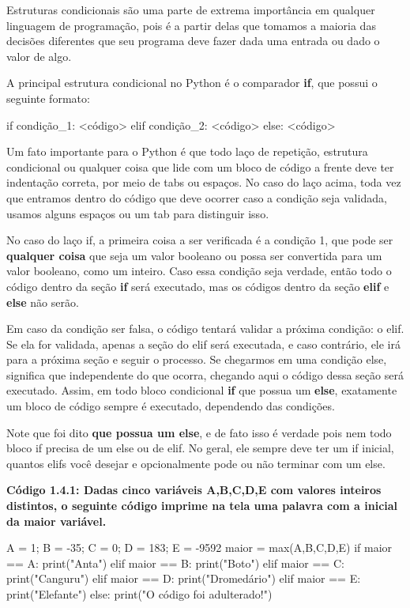 \documentclass[11pt, a4paper]{article}
\begin{document}
Estruturas condicionais são uma parte de extrema importância em qualquer linguagem de programação, pois é a partir delas que tomamos a maioria das decisões diferentes que seu programa deve fazer dada uma entrada ou dado o valor de algo.

A principal estrutura condicional no Python é o comparador \textbf{if}, que possui o seguinte formato:

\begin{code}
if condição_1:
    <código>
elif condição_2:
    <código>
else:
    <código>
\end{code}

Um fato importante para o Python é que todo laço de repetição, estrutura condicional ou qualquer coisa que lide com um bloco de código a frente deve ter indentação correta, por meio de tabs ou espaços. No caso do laço acima, toda vez que entramos dentro do código que deve ocorrer caso a condição seja validada, usamos alguns espaços ou um tab para distinguir isso.

No caso do laço if, a primeira coisa a ser verificada é a condição 1, que pode ser \textbf{qualquer coisa} que seja um valor booleano ou possa ser convertida para um valor booleano, como um inteiro. Caso essa condição seja verdade, então todo o código dentro da seção \textbf{if} será executado, mas os códigos dentro da seção \textbf{elif} e \textbf{else} não serão.

Em caso da condição ser falsa, o código tentará validar a próxima condição: o elif. Se ela for validada, apenas a seção do elif será executada, e caso contrário, ele irá para a próxima seção e seguir o processo. Se chegarmos em uma condição else, significa que independente do que ocorra, chegando aqui o código dessa seção será executado. Assim, em todo bloco condicional \textbf{if} que possua um \textbf{else}, exatamente um bloco de código sempre é executado, dependendo das condições.

Note que foi dito \textbf{que possua um else}, e de fato isso é verdade pois nem todo bloco if precisa de um else ou de elif. No geral, ele sempre deve ter um if inicial, quantos elifs você desejar e opcionalmente pode ou não terminar com um else.

\textbf{Código 1.4.1: Dadas cinco variáveis A,B,C,D,E com valores inteiros distintos, o seguinte código imprime na tela uma palavra com a inicial da maior variável.}

\begin{code}
A = 1; B = -35; C = 0; D = 183; E = -9592
maior = max(A,B,C,D,E)
if maior == A:
    print("Anta")
elif maior == B:
    print("Boto")
elif maior == C:
    print("Canguru")
elif maior == D:
    print("Dromedário")
elif maior == E:
    print("Elefante")
else:
    print("O código foi adulterado!")
\end{code}
\end{document}
